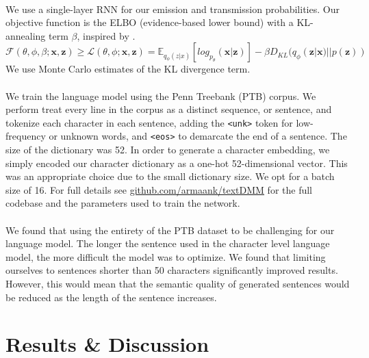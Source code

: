 \documentclass[justified,nobib]{tufte-handout}
\begin{document}
\begin{fullwidth}
\paragraph{}
 We use a single-layer RNN for our emission and transmission probabilities. Our objective function is the ELBO (evidence-based lower bound) with a KL-annealing term $\beta$, inspired by \cite{bvae}.
 \begin{equation}
\mathcal{F}(\theta,\phi,\beta;\bm{x},\bm{z}) \geq \mathcal{L}(\theta,\phi;\bm{x},\bm{z}) = \mathbb{E}_{q_{\phi}(z|x)}[log_{p_{\theta}}(\bm{x}|\bm{z})]-\beta D_{KL}(q_{\phi}(\bm{z}|\bm{x})||p(\bm{z}))
\end{equation} 
We use Monte Carlo estimates of the KL divergence term. 
\paragraph{} We train the language model using the Penn Treebank (PTB) corpus. We perform treat every line in the corpus as a distinct sequence, or sentence, and tokenize each character in each sentence, adding the \texttt{<unk>} token for low-frequency or unknown words, and \texttt{<eos>} to demarcate the end of a sentence. The size of the dictionary was 52. In order to generate a character embedding, we simply encoded our character dictionary as a one-hot 52-dimensional vector. This was an appropriate choice due to the small dictionary size. We opt for a batch size of 16. For full details see \underline{\href{https://github.com/armaank/textDMM}{github.com/armaank/textDMM}} for the full codebase and the parameters used to train the network.
\paragraph{} We found that using the entirety of the PTB dataset to be challenging for our language model. The longer the sentence used in the character level language model, the more difficult the model was to optimize. We found that limiting ourselves to sentences shorter than 50 characters significantly improved results. However, this would mean that the semantic quality of generated sentences would be reduced as the length of the sentence increases. 

\section{Results \& Discussion}


\end{fullwidth}
\end{document}
